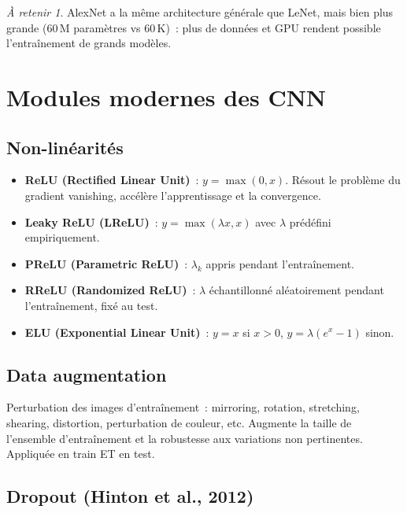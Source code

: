 \documentclass[a4paper,11pt]{article}
\theoremstyle{definition}
\theoremstyle{remark}
\newtheorem*{important}{\`A retenir}
\begin{document}
\begin{important}
  AlexNet a la m\^eme architecture g\'en\'erale que LeNet, mais
  bien plus grande (60\,M param\`etres vs 60\,K)~: plus de donn\'ees
  et GPU rendent possible l'entra\^inement de grands mod\`eles.
\end{important}

\section{Modules modernes des CNN}

\subsection{Non-lin\'earit\'es}

\begin{itemize}
  \item \textbf{ReLU (Rectified Linear Unit)}~: $y = \max(0, x)$.
    R\'esout le probl\`eme du gradient vanishing, acc\'el\`ere
    l'apprentissage et la convergence.
  \item \textbf{Leaky ReLU (LReLU)}~: $y = \max(\lambda x, x)$
    avec $\lambda$ pr\'ed\'efini empiriquement.
  \item \textbf{PReLU (Parametric ReLU)}~: $\lambda_k$ appris
    pendant l'entra\^inement.
  \item \textbf{RReLU (Randomized ReLU)}~: $\lambda$ \'echantillonn\'e
    al\'eatoirement pendant l'entra\^inement, fix\'e au test.
  \item \textbf{ELU (Exponential Linear Unit)}~: $y = x$ si $x>0$,
    $y = \lambda(e^x - 1)$ sinon.
\end{itemize}

\subsection{Data augmentation}

Perturbation des images d'entra\^inement~: mirroring, rotation,
stretching, shearing, distortion, perturbation de couleur, etc.
Augmente la taille de l'ensemble d'entra\^inement et la robustesse
aux variations non pertinentes. Appliqu\'ee en train ET en test.

\subsection{Dropout (Hinton et al., 2012)}
\end{document}
